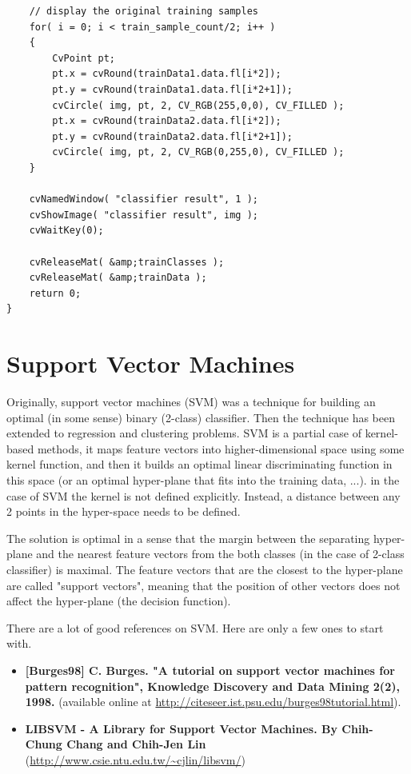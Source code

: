\begin{lstlisting}
    // display the original training samples
    for( i = 0; i < train_sample_count/2; i++ )
    {
        CvPoint pt;
        pt.x = cvRound(trainData1.data.fl[i*2]);
        pt.y = cvRound(trainData1.data.fl[i*2+1]);
        cvCircle( img, pt, 2, CV_RGB(255,0,0), CV_FILLED );
        pt.x = cvRound(trainData2.data.fl[i*2]);
        pt.y = cvRound(trainData2.data.fl[i*2+1]);
        cvCircle( img, pt, 2, CV_RGB(0,255,0), CV_FILLED );
    }

    cvNamedWindow( "classifier result", 1 );
    cvShowImage( "classifier result", img );
    cvWaitKey(0);

    cvReleaseMat( &amp;trainClasses );
    cvReleaseMat( &amp;trainData );
    return 0;
}
\end{lstlisting}


\section{Support Vector Machines}

Originally, support vector machines (SVM) was a technique for building an optimal (in some sense) binary (2-class) classifier. Then the technique has been extended to regression and clustering problems. SVM is a partial case of kernel-based methods, it maps feature vectors into higher-dimensional space using some kernel function, and then it builds an optimal linear discriminating function in this space (or an optimal hyper-plane that fits into the training data, ...). in the case of SVM the kernel is not defined explicitly. Instead, a distance between any 2 points in the hyper-space needs to be defined.

The solution is optimal in a sense that the margin between the separating hyper-plane and the nearest feature vectors from the both classes (in the case of 2-class classifier) is maximal. The feature vectors that are the closest to the hyper-plane are called "support vectors", meaning that the position of other vectors does not affect the hyper-plane (the decision function).

There are a lot of good references on SVM. Here are only a few ones to start with.
\begin{itemize}
\item \textbf{[Burges98] C. Burges. "A tutorial on support vector machines for pattern recognition", Knowledge Discovery and Data Mining 2(2), 1998.} (available online at \url{http://citeseer.ist.psu.edu/burges98tutorial.html}).
\item \textbf{LIBSVM - A Library for Support Vector Machines. By Chih-Chung Chang and Chih-Jen Lin} (\url{http://www.csie.ntu.edu.tw/~cjlin/libsvm/})
\end{itemize}

